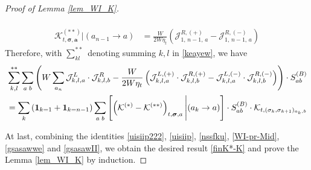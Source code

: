 \documentclass[10pt,a4paper]{amsart}
\newcommand{\cal}{\mathcal}
\begin{document}
\begin{proof}[Proof of Lemma \ref{lem_WI_K}]
\begin{itemize}
\begin{align}
      \\\nonumber
       {\cal K}^{(**)}_{t, \boldsymbol{\sigma}, \textbf{a}}\Bigg|(a_{n-1}\to a) 
      & = \frac{W}{2W\eta_t}
      \left({\cal J}^{R, (+)}_{1,\,n-1,\,a}-{\cal J}^{R, (-)}_{1,\,n-1,\,a}\right)
  \end{align}
  Therefore, with $\sum_{kl}^{**}$ denoting  summing  $k,l$ in \eqref{keayew}, we have  
  \begin{align}\label{uisiip222}
    &\sum_{k,l}^{**}  \sum_{a\;b}
    \left( {W}\sum_{a_n} 
        {\cal J}^{L}_{k,l,a}\cdot{\cal J}^{R}_{k,l,b}
        -\frac{W}{2W\eta_t} 
        \left(
        {\cal J}^{L,(+)}_{k,l,a}\cdot{\cal J}^{R,(+)}_{k,l,b}
        -
        {\cal J}^{L,(-)}_{k,l,a}\cdot{\cal J}^{R,(-)}_{k,l,b}
        \right)
        \right)\cdot S^{(B)}_{ab} 
        \\\nonumber
       &=\sum_{k}\left({\bf 1}_{k=1}+{\bf 1}_{k=n-1}\right) \sum_{a\;b}
        \left[\left({\cal K}^{(*)}-{\cal K}^{(**)}\right)_{t, \boldsymbol{\sigma}, \textbf{a}}\Bigg|(a_k\to a)\right]
        \cdot S^{(B)}_{ab}\cdot  {\cal K}_{t, ( \sigma _k,  \sigma _{k+1})_{a_k,b}}
 \end{align}
 
\end{itemize}
At last,  combining  the identities \eqref{uisiip222}, \eqref{uisiip}, \eqref{nssfku}, \eqref{WI-pr-Mid}, \eqref{gsasawwe} and \eqref{gsasawII}, we obtain  the desired result  \eqref{finK*-K} and prove the Lemma \ref{lem_WI_K} by induction. 
\end{proof}
\end{document}
